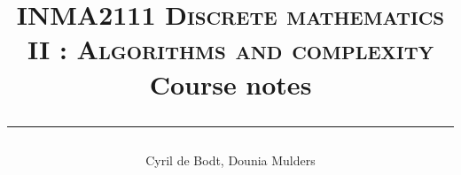 


\title{\textsc{ \normalsize INMA2111 Discrete mathematics II : Algorithms and complexity} \\ Course notes  \vspace{0.5cm} \hrule height 1pt}
\author{Cyril de Bodt, Dounia Mulders}





\maketitle








